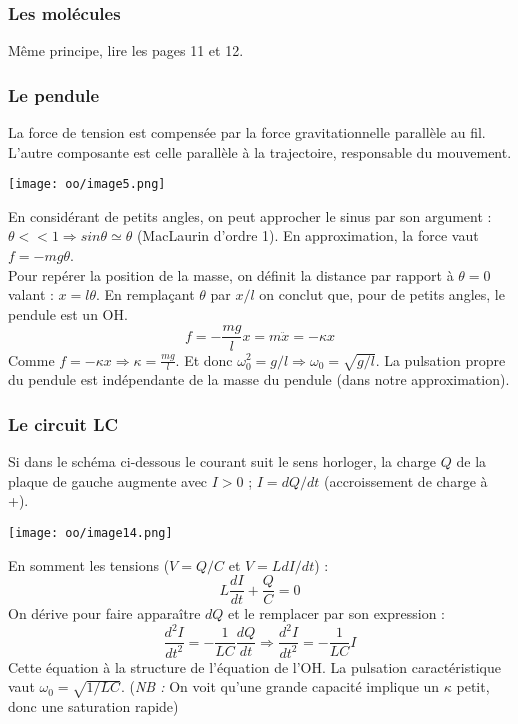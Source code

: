 \documentclass[british,french,11pt, a4paper, openany]{book}
\begin{document}
	\subsubsection{Les molécules}
	Même principe, lire les pages 11 et 12.
	
	\subsubsection{Le pendule}
	La force de tension est compensée par la force gravitationnelle parallèle au fil. L'autre composante  est celle parallèle à la trajectoire, responsable du mouvement.
	\begin{center}
		\texttt{[image: oo/image5.png]}
	\end{center}
	En considérant de petits angles, on peut approcher le sinus par son argument : $\theta << 1 \Rightarrow sin\theta \simeq \theta$ (MacLaurin d'ordre 1). En approximation, la force vaut $f = -mg\theta$.\\
	
	Pour repérer la position de la masse, on définit la distance par rapport à $\theta = 0$ valant : $x = l\theta$. En remplaçant $\theta$ par $x/l$ on conclut que, pour de petits angles, le pendule est un OH.
	\begin{equation}
		f = -\frac{mg}{l}x = m\ddot{x} = -\kappa x
	\end{equation}
	Comme $f = -\kappa x \Rightarrow \kappa = \frac{mg}{l}$. Et donc $\omega_0^2 = g/l \Rightarrow \omega_0 = \sqrt{g/l}$. La pulsation propre du pendule est indépendante de la masse du pendule (dans notre approximation).
	
	\subsubsection{Le circuit LC}
	Si dans le schéma ci-dessous le courant suit le sens horloger, la charge $Q$ de la plaque de gauche augmente avec $I > 0$ ; $I = dQ/dt$ (accroissement de charge à +).
	
	\begin{center}
		\texttt{[image: oo/image14.png]}
	\end{center}
	
	En somment les tensions ($V = Q/C$ et $V = L dI/dt$) :
	\begin{equation}
		L\frac{dI}{dt} + \frac{Q}{C} = 0
	\end{equation}
	On dérive pour faire apparaître $dQ$ et le remplacer par son expression :
	\begin{equation}
		\frac{d^2I}{dt^2} = -\frac{1}{LC}\frac{dQ}{dt} \Rightarrow \frac{d^2I}{dt^2} = - \frac{1}{LC}I
	\end{equation}
	Cette équation à la structure de l'équation de l'OH. La pulsation caractéristique vaut $\omega_0 = \sqrt{1/LC}$. (\textit{NB :} On voit qu'une grande capacité implique un $\kappa$ petit, donc une saturation rapide)
	
\end{document}
